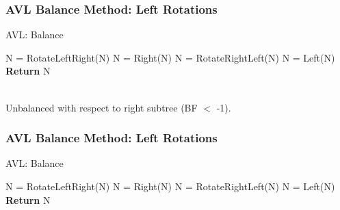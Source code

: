 \documentclass{beamer}
\begin{document}
\begin{frame}[fragile]
    \frametitle{AVL Balance Method: Left Rotations}
    \begin{minipage}{0.44\textwidth}
        \begin{algorithm}[H]
            \caption{AVL: Balance}
            \scriptsize
            \begin{algorithmic}[1]
                \State N = RotateLeftRight(N)
                \Else
                \State N = Right(N)
                \EndIf
                \color{red}
                \State N = RotateRightLeft(N)
                \Else
                \State N = Left(N)
                \EndIf
                \EndIf
                \color{black}
                \State \textbf{Return} N
                \EndProcedure
            \end{algorithmic}
        \end{algorithm}
    \end{minipage}
    \begin{minipage}{0.24\textwidth}
    \end{minipage}
    \vfill
    \\Unbalanced with respect to right subtree (BF $<$ -1).
    \vfill
\end{frame}

\begin{frame}[fragile]
    \frametitle{AVL Balance Method: Left Rotations}
    \begin{minipage}{0.44\textwidth}
        \begin{algorithm}[H]
            \caption{AVL: Balance}
            \scriptsize
            \begin{algorithmic}[1]
                \State N = RotateLeftRight(N)
                \Else
                \State N = Right(N)
                \EndIf
                \color{orange}
                \State N = RotateRightLeft(N)
                \color{blue}
                \Else
                \State N = Left(N)
                \EndIf
                \EndIf
                \color{black}
                \State \textbf{Return} N
                \EndProcedure
            \end{algorithmic}
        \end{algorithm}
    \end{minipage}
    \begin{minipage}{0.24\textwidth}
    \end{minipage}
\end{frame}
\end{document}
